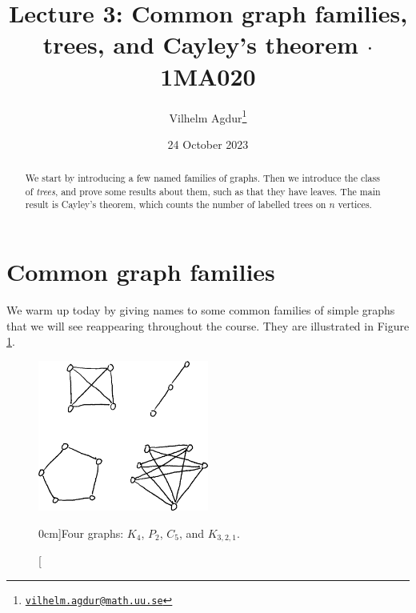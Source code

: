 \documentclass[nobib]{tufte-handout}
\title{Lecture 3: Common graph families, trees, and Cayley's theorem $\cdot$ 1MA020}
\author[Vilhelm Agdur]{Vilhelm Agdur\thanks{\href{mailto:vilhelm.agdur@math.uu.se}{\nolinkurl{vilhelm.agdur@math.uu.se}}}}
\date{24 October 2023}
\begin{document}
\maketitle%

\begin{abstract}
\noindent
We start by introducing a few named families of graphs. Then we introduce the class of \emph{trees}, and prove some results about them, such as that they have leaves. The main result is Cayley's theorem, which counts the number of labelled trees on $n$ vertices.
\end{abstract}

\section{Common graph families}

We warm up today by giving names to some common families of simple graphs that we will see reappearing throughout the course. They are illustrated in Figure \ref{fig:graph_families}.

\begin{figure}
  \centering
  \includegraphics[width=0.5\textwidth]{graphics/L3_trees/graph_families.png}
  \caption[][0cm]{Four graphs: $K_4$, $P_2$, $C_5$, and $K_{3,2,1}$.}
  \label{fig:graph_families}
\end{figure}
\end{document}
